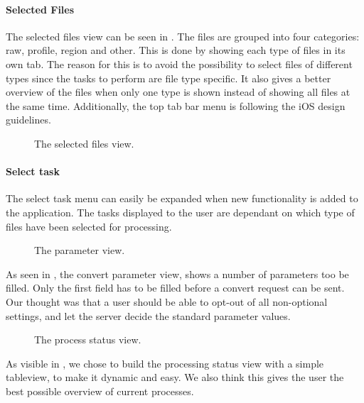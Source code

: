 \paragraph{Selected Files}
The selected files view can be seen in . The files are grouped into four categories: raw, profile, region and other. This is done by showing each type of files in its own tab. The reason for this is to avoid the possibility to select files of different types since the tasks to perform are file type specific. It also gives a better overview of the files when only one type is shown instead of showing all files at the same time. Additionally, the top tab bar menu is following the iOS design guidelines.

\begin{figure}[ht]
\caption{The selected files view.}
\label{fig:ios_selectedFiles2}
\end{figure}
\FloatBarrier

\paragraph{Select task}
The select task menu can easily be expanded when new functionality is added to the application. The tasks displayed to the user are dependant on which type of files have been selected for processing. 

\begin{figure}[ht]
\caption{The parameter view.}
\label{fig:ios_convertParameters}
\end{figure}
\FloatBarrier

As seen in , the convert parameter view, shows a number of parameters too be filled. Only the first field has to be filled before a  convert request can be sent. Our thought was that a user should be able to opt-out of all non-optional settings, and let the server decide the standard parameter values. 

\begin{figure}[ht]
\caption{The process status view.}
\label{fig:ios_processingStatus}
\end{figure}
\FloatBarrier

As visible in , we chose to build the processing status view with a simple tableview, to make it dynamic and easy. We also think this gives the user the best possible overview of current processes.

\paragraph{}